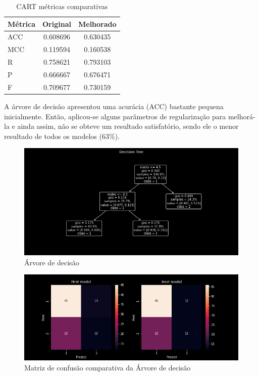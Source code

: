 \begin{table}[ht]
    \centering
    \begin{tabular}{lcc}
        \rowcolor{pagecolor!50!COLOR1}
        \hline
        Métrica & Original & Melhorado \\\hline\hline
        ACC     & 0.608696 & 0.630435  \\\hline
        MCC     & 0.119594 & 0.160538  \\\hline
        R       & 0.758621 & 0.793103  \\\hline
        P       & 0.666667 & 0.676471  \\\hline
        F       & 0.709677 & 0.730159
    \end{tabular}
    \caption{CART métricas comparativas}
\end{table}


A árvore de decisão apresentou uma acurácia (ACC) bastante pequena inicialmente. Então, aplicou-se alguns parâmetros de regularização para melhorá-la e ainda assim, não se obteve um resultado satisfatório, sendo ele o menor resultado de todos os modelos ($63\%$).\\

\begin{figure}[H]
    \centering
    \includegraphics[width=\linewidth, scale=0.5]{../../figuras/machine_learning/cart_tree.png}
    \caption{Árvore de decisão}
\end{figure}

\begin{figure}[H]
    \centering
    \includegraphics[width=\linewidth, scale=.6]{../../figuras/machine_learning/CART_MC.png}
    \caption{Matriz de confusão comparativa da Árvore de decisão}
\end{figure}

